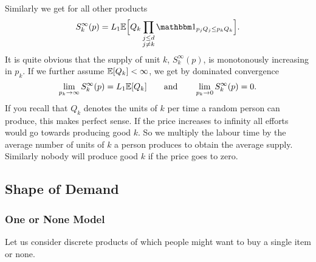 Similarly we get for all other products
\[
	S_k^\infty(p)
	= L_1 \E\Bigl[
		Q_k \prod_{\substack{j\le\dims\\j\neq k}}\ind_{p_jQ_j\le p_k Q_k}
	\Bigr].
\]
It is quite obvious that the supply of unit \(k\), \(S^\infty_k(p)\), is
monotonously increasing in \(p_k\).  If we further assume \(\mathbb{E}[Q_k]<\infty\), we
get by dominated convergence
\[
	\lim_{p_k\to \infty}S_k^\infty(p) = L_1\mathbb{E}[Q_k]
	\qquad\text{and}\qquad
	\lim_{p_k\to 0}S_k^\infty(p) = 0.
\]
If you recall that \(Q_k\) denotes the units of \(k\) per time a random
person can produce, this makes perfect sense. If the price increases to infinity
all efforts would go towards producing good \(k\). So we multiply the labour
time by the average number of units of \(k\) a person produces to obtain the
average supply. Similarly nobody will produce good \(k\) if the price goes to
zero.

\subsection{Shape of Demand}

\subsubsection{One or None Model}

Let us consider discrete products of which people might want to buy a single
item or none.


